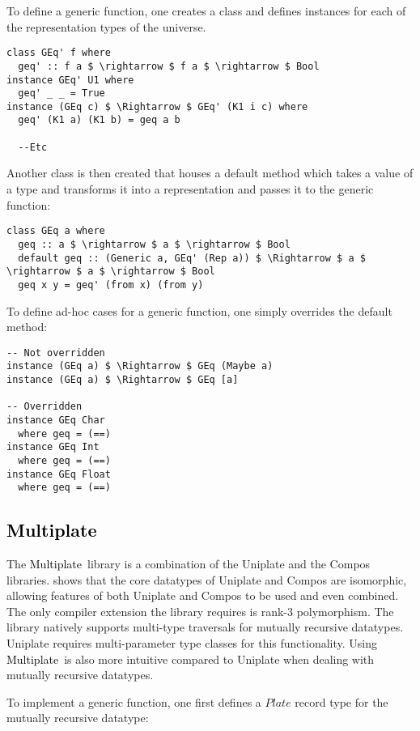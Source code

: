 \documentclass[twocolumn,11pt,a4paper]{article}
\newcommand{\multiplate}{\textcolor{black}{Multiplate}}
\begin{document}
To define a generic function, one creates a class and defines instances for each of the representation types of the universe.

\begin{lstlisting}[mathescape=true]
class GEq' f where
  geq' :: f a $ \rightarrow $ f a $ \rightarrow $ Bool
instance GEq' U1 where
  geq' _ _ = True
instance (GEq c) $ \Rightarrow $ GEq' (K1 i c) where
  geq' (K1 a) (K1 b) = geq a b
  
  --Etc
\end{lstlisting}
Another class is then created that houses a default method which takes a value of a type and transforms it into a representation and passes it to the generic function:

\begin{lstlisting}[mathescape=true]
class GEq a where 
  geq :: a $ \rightarrow $ a $ \rightarrow $ Bool
  default geq :: (Generic a, GEq' (Rep a)) $ \Rightarrow $ a $ \rightarrow $ a $ \rightarrow $ Bool
  geq x y = geq' (from x) (from y)
\end{lstlisting}

To define ad-hoc cases for a generic function, one simply overrides the default method:

\begin{lstlisting}[mathescape=true]
-- Not overridden
instance (GEq a) $ \Rightarrow $ GEq (Maybe a)
instance (GEq a) $ \Rightarrow $ GEq [a]

-- Overridden
instance GEq Char   
  where geq = (==)
instance GEq Int    
  where geq = (==)
instance GEq Float  
  where geq = (==)
\end{lstlisting}

\subsection{\multiplate}\label{multiplateview}
The \multiplate\ library is a combination of the Uniplate and the Compos libraries. 
\citet{multiplate:2011:lib} shows that the core datatypes of Uniplate and Compos are isomorphic, allowing features of both Uniplate and Compos to be used and even combined. 
The only compiler extension the library requires is rank-3 polymorphism.
The library natively supports multi-type traversals for mutually recursive datatypes. 
Uniplate requires multi-parameter type classes for this functionality. 
Using \multiplate\ is also more intuitive compared to Uniplate when dealing with mutually recursive datatypes.

To implement a generic function, one first defines a $ Plate $ record type for the mutually recursive datatype:
\end{document}
